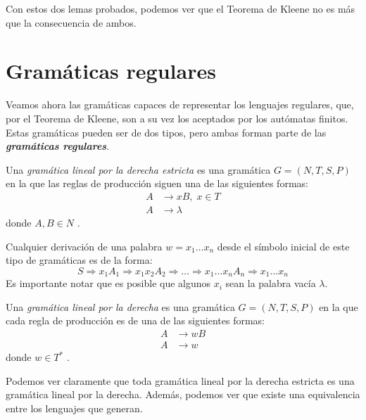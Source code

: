 Con estos dos lemas probados, podemos ver que el Teorema de Kleene no es más que la consecuencia de ambos.

\section{Gramáticas regulares}

Veamos ahora las gramáticas capaces de representar los lenguajes regulares, que, por el Teorema de Kleene, son a su vez 
los aceptados por los autómatas finitos. Estas gramáticas pueden ser de dos tipos, pero ambas forman parte de las \textbf{\textit{gramáticas regulares}}.

\begin{definicion}\label{def:gramatica-lde} Una 
\textit{gramática lineal por la derecha estricta} es una gramática $G=(N,T,S,P)$ en la que las reglas de producción 
siguen una de las siguientes formas:
\begin{align*}
    A &\to xB,\;x\in T \\
    A &\to \lambda
\end{align*}
donde $A,B\in N$ \cite{pfenning_2000}.
\end{definicion}

Cualquier derivación de una palabra $w=x_1\dots x_n$ desde el símbolo inicial de este tipo de gramáticas es de la 
forma:
\begin{equation}
    S\Rightarrow x_1A_1 \Rightarrow x_1x_2A_2\Rightarrow\dotsc\Rightarrow x_1\dots x_nA_n\Rightarrow x_1\dots x_n
\end{equation}
Es importante notar que es posible que algunos $x_i$ sean la palabra vacía $\lambda$.

\begin{definicion}\label{def:gramatica-ld} Una 
\textit{gramática lineal por la derecha} es una gramática $G=(N,T,S,P)$ en la que cada regla de producción es de una de 
las siguientes formas:
\begin{align*}
    A &\to wB \\
    A &\to w
\end{align*}
donde $w\in T^*$ \cite{pfenning_2000}.
\end{definicion}

Podemos ver claramente que toda gramática lineal por la derecha estricta es una gramática lineal por la derecha. Además, podemos ver que existe una equivalencia entre los lenguajes que generan.

